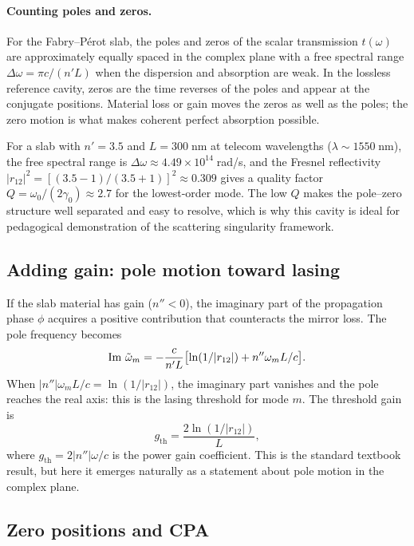 \paragraph{Counting poles and zeros.}
For the Fabry--P\'erot slab, the poles and zeros of the scalar
transmission $t(\omega)$ are approximately equally spaced in the complex
plane with a free spectral range $\Delta\omega = \pi c/(n'L)$ when the
dispersion and absorption are weak. In the lossless reference cavity,
zeros are the time reverses of the poles and appear at the conjugate
positions. Material loss or gain moves the zeros as well as the poles;
the zero motion is what makes coherent perfect absorption possible.

For a slab with $n' = 3.5$ and $L = 300\;$nm at telecom wavelengths
($\lambda \sim 1550\;$nm), the free spectral range is
$\Delta\omega \approx 4.49 \times 10^{14}\;$rad/s, and the Fresnel
reflectivity $|r_{12}|^2 = [(3.5-1)/(3.5+1)]^2 \approx 0.309$ gives
a quality factor $Q = \omega_0/(2\gamma_0) \approx 2.7$
for the lowest-order mode. The low $Q$ makes the pole--zero structure
well separated and easy to resolve, which is why this cavity is ideal
for pedagogical demonstration of the scattering singularity framework.

\subsection{Adding gain: pole motion toward lasing}
\label{ssec:fp-gain}

If the slab material has gain ($n'' < 0$), the imaginary part of the
propagation phase $\phi$ acquires a positive contribution that
counteracts the mirror loss. The pole frequency becomes
\begin{equation}
 \operatorname{Im}\,\tilde{\omega}_m = -\frac{c}{n'L}\bigl[\ln(1/|r_{12}|) + n''\omega_m L/c\bigr].
 \label{eq:fp-pole-gain}
\end{equation}
When $|n''|\omega_m L/c = \ln(1/|r_{12}|)$, the imaginary part vanishes
and the pole reaches the real axis: this is the lasing threshold for mode
$m$. The threshold gain is
\begin{equation}
 g_{\mathrm{th}} = \frac{2\ln(1/|r_{12}|)}{L},
 \label{eq:fp-threshold}
\end{equation}
where $g_{\mathrm{th}} = 2|n''|\omega/c$ is the power gain coefficient.
This is the standard textbook result, but here it emerges naturally as a
statement about pole motion in the complex plane.

\subsection{Zero positions and CPA}
\label{ssec:fp-zeros}

